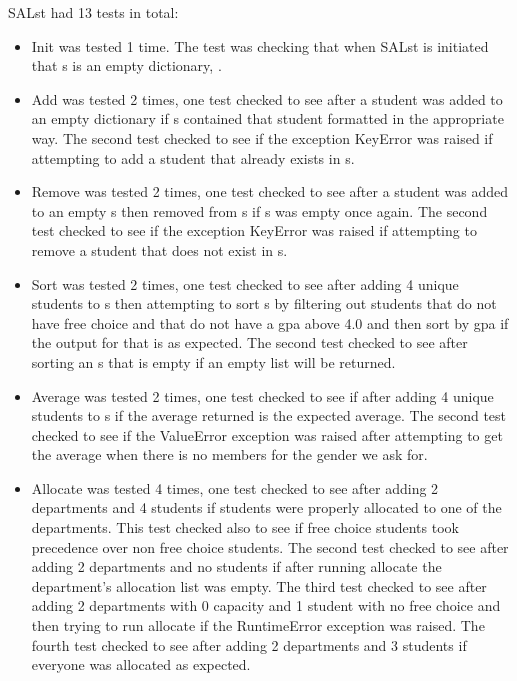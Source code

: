 \documentclass[12pt]{article}
\begin{document}
SALst had 13 tests in total:
\begin{itemize}
	\item Init was tested 1 time. The test was checking that when SALst is initiated that s is an empty dictionary, {}.
	
	\item Add was tested 2 times, one test checked to see after a student was added to an empty dictionary if s contained that student
	formatted in the appropriate way. The second test checked to see if the exception KeyError was raised if attempting to add a student
	that already exists in s.
	
	\item Remove was tested 2 times, one test checked to see after a student was added to an empty s then removed from s if s was empty 
	once again. The second test checked to see if the exception KeyError was raised if attempting to remove a student that does not exist
	in s.
	
	\item Sort was tested 2 times, one test checked to see after adding 4 unique students to s then attempting to sort s by filtering
	out students that do not have free choice and that do not have a gpa above 4.0 and then sort by gpa if the output for that is as expected.
	The second test checked to see after sorting an s that is empty if an empty list will be returned.
	
	\item Average was tested 2 times, one test checked to see if after adding 4 unique students to s if the average returned is the expected
	average. The second test checked to see if the ValueError exception was raised after attempting to get the average when there is no members
	for the gender we ask for.
	
	\item Allocate was tested 4 times, one test checked to see after adding 2 departments and 4 students if students were properly allocated 
	to one of the departments. This test checked also to see if free choice students took precedence over non free choice students. The second
	test checked to see after adding 2 departments and no students if after running allocate the department's allocation list was empty. The 
	third test checked to see after adding 2 departments with 0 capacity and 1 student with no free choice and then trying to run allocate if
	the RuntimeError exception was raised. The fourth test checked to see after adding 2 departments and 3 students if everyone was allocated 
	as expected. 

\end{itemize}
\end{document}
